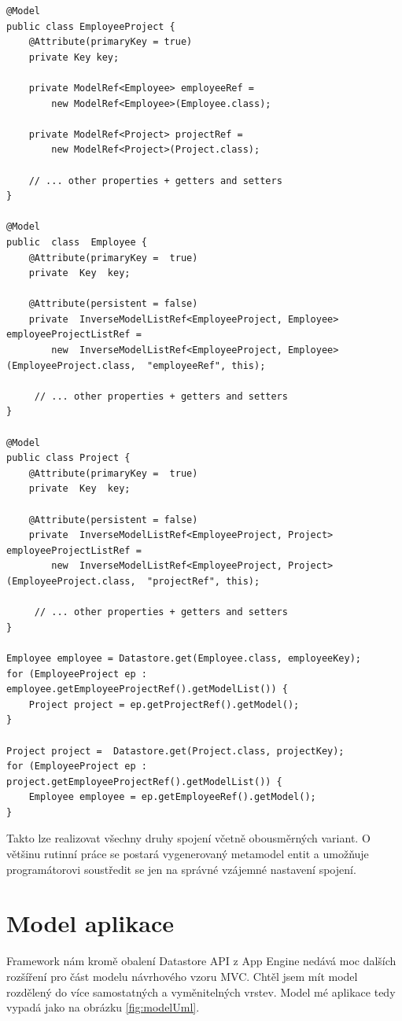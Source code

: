 \begin{lstlisting}[caption={Ukázka many-to-many vztahu s použitím spojovací entitní třídy},label=lst:manyToManyJoinTable,belowcaptionskip=0.4cm]
@Model
public class EmployeeProject {
	@Attribute(primaryKey = true)
	private Key key;

	private ModelRef<Employee> employeeRef = 
		new ModelRef<Employee>(Employee.class);

	private ModelRef<Project> projectRef = 
		new ModelRef<Project>(Project.class);

	// ... other properties + getters and setters
}

@Model
public  class  Employee {
	@Attribute(primaryKey =  true)
	private  Key  key;

	@Attribute(persistent = false)
	private  InverseModelListRef<EmployeeProject, Employee>  employeeProjectListRef =
		new  InverseModelListRef<EmployeeProject, Employee>(EmployeeProject.class,  "employeeRef", this);

     // ... other properties + getters and setters
}

@Model
public class Project {
	@Attribute(primaryKey =  true)
	private  Key  key;

	@Attribute(persistent = false)
	private  InverseModelListRef<EmployeeProject, Project>  employeeProjectListRef =
		new  InverseModelListRef<EmployeeProject, Project>(EmployeeProject.class,  "projectRef", this);

     // ... other properties + getters and setters
}

Employee employee = Datastore.get(Employee.class, employeeKey);
for (EmployeeProject ep : employee.getEmployeeProjectRef().getModelList()) {
	Project project = ep.getProjectRef().getModel();
}

Project project =  Datastore.get(Project.class, projectKey);
for (EmployeeProject ep : project.getEmployeeProjectRef().getModelList()) {
	Employee employee = ep.getEmployeeRef().getModel();
}
\end{lstlisting}

Takto lze realizovat všechny druhy spojení včetně obousměrných variant. O většinu rutinní práce se postará vygenerovaný metamodel entit a umožňuje programátorovi soustředit se jen na správné vzájemné nastavení spojení.

\section{Model aplikace}
Framework nám kromě obalení Datastore API z App Engine nedává moc dalších rozšíření pro část modelu návrhového vzoru MVC. Chtěl jsem mít model rozdělený do více samostatných a vyměnitelných vrstev. Model mé aplikace tedy vypadá jako na obrázku \ref{fig:modelUml}.

